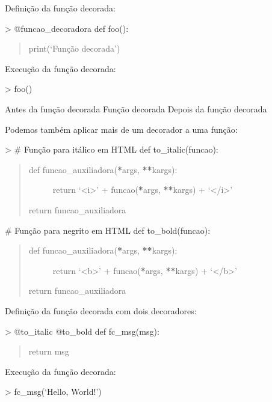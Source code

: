 \documentclass[letterpaper,10pt,brazil]{sphinxmanual}
\begin{document}
Definição da função decorada:

\textgreater{} @funcao\_decoradora
def foo():
\begin{quote}

print(‘Função decorada’)
\end{quote}

Execução da função decorada:

\textgreater{} foo()

Antes da função decorada
Função decorada
Depois da função decorada

Podemos também aplicar mais de um decorador a uma função:

\textgreater{} \# Função para itálico em HTML
def to\_italic(funcao):
\begin{quote}
\begin{description}
\item[{def funcao\_auxiliadora({\color{red}\bfseries{}*}args, {\color{red}\bfseries{}**}kargs):}] \leavevmode
return ‘\textless{}i\textgreater{}’ + funcao({\color{red}\bfseries{}*}args, {\color{red}\bfseries{}**}kargs) + ‘\textless{}/i\textgreater{}’

\end{description}

return funcao\_auxiliadora
\end{quote}

\# Função para negrito em HTML
def to\_bold(funcao):
\begin{quote}
\begin{description}
\item[{def funcao\_auxiliadora({\color{red}\bfseries{}*}args, {\color{red}\bfseries{}**}kargs):}] \leavevmode
return ‘\textless{}b\textgreater{}’ + funcao({\color{red}\bfseries{}*}args, {\color{red}\bfseries{}**}kargs) + ‘\textless{}/b\textgreater{}’

\end{description}

return funcao\_auxiliadora
\end{quote}

Definição da função decorada com dois decoradores:

\textgreater{} @to\_italic
@to\_bold
def fc\_msg(msg):
\begin{quote}

return msg
\end{quote}

Execução da função decorada:

\textgreater{} fc\_msg(‘Hello, World!’)
\end{document}
